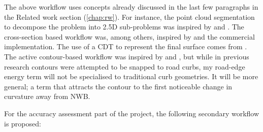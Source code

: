 The above workflow uses concepts already discussed in the last few paragraphs in the Related work section (\ref{chap:rw}). For instance, the point cloud segmentation to decompose the problem into 2.5D sub-problems was inspired by \cite{oudeElberink_vosselman_2009} and \cite{boyko_funkhauser_2011}. The cross-section based workflow was, among others, inspired by \cite{yang_etal_2013} and the commercial implementation. The use of a CDT to represent the final surface comes from \cite{oudeElberink_vosselman_2006}. The active contour-based workflow was inspired by \cite{boyko_funkhauser_2011} and \cite{gopfert_etal_2011}, but while in previous research contours were attempted to be snapped to road curbs, my road-edge energy term will not be specialised to traditional curb geometries. It will be more general; a term that attracts the contour to the first noticeable change in curvature away from NWB.

For the accuracy assessment part of the project, the following secondary workflow is proposed:

